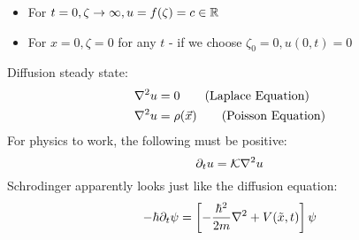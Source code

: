 \documentclass[Maths.tex]{subfiles}
\begin{document}
\begin{itemize}
	\item For $t=0, \zeta \to \infty, u = f(\zeta) = c \in \mathbb{R}$
	\item For $x=0, \zeta = 0$ for any $t$ - if we choose $\zeta_0 = 0, u(0,t) = 0$
\end{itemize}
Diffusion steady state:
\begin{align}
	\nabla^2u &= 0 \tag{Laplace Equation} \\
	\nabla^2u &= \rho(\vec{x}) \tag{Poisson Equation}
\end{align}
For physics to work, the following must be positive:
\begin{equation}
	\partial_tu = \mathcal{K}\nabla^2u
\end{equation}
Schrodinger apparently looks just like the diffusion equation:
\begin{equation}
	-\hbar\partial_t\psi = \left[-\frac{\hbar^2}{2m}\nabla^2 + V(\tilde{x},t)\right]\psi
\end{equation}
\end{document}

